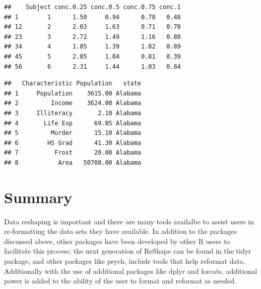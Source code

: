 \documentclass[]{book}
\newenvironment{Shaded}{\begin{snugshade}}{\end{snugshade}}
\newcommand{\DataTypeTok}[1]{\textcolor[rgb]{0.13,0.29,0.53}{#1}}
\newcommand{\KeywordTok}[1]{\textcolor[rgb]{0.13,0.29,0.53}{\textbf{#1}}}
\newcommand{\NormalTok}[1]{#1}
\newcommand{\OperatorTok}[1]{\textcolor[rgb]{0.81,0.36,0.00}{\textbf{#1}}}
\newcommand{\StringTok}[1]{\textcolor[rgb]{0.31,0.60,0.02}{#1}}
\begin{document}
\begin{verbatim}
##    Subject conc.0.25 conc.0.5 conc.0.75 conc.1
## 1        1      1.50     0.94      0.78   0.48
## 12       2      2.03     1.63      0.71   0.70
## 23       3      2.72     1.49      1.16   0.80
## 34       4      1.85     1.39      1.02   0.89
## 45       5      2.05     1.04      0.81   0.39
## 56       6      2.31     1.44      1.03   0.84
\end{verbatim}

\begin{Shaded}
\end{Shaded}

\begin{verbatim}
##   Characteristic Population   state
## 1     Population    3615.00 Alabama
## 2         Income    3624.00 Alabama
## 3     Illiteracy       2.10 Alabama
## 4       Life Exp      69.05 Alabama
## 5         Murder      15.10 Alabama
## 6        HS Grad      41.30 Alabama
## 7          Frost      20.00 Alabama
## 8           Area   50708.00 Alabama
\end{verbatim}

\hypertarget{summary}{%
\section{Summary}\label{summary}}

Data reshaping is important and there are many tools availalbe to assist users in re-formatting the data sets they have available. In addition to the packages discussed above, other packages have been developed by other R users to facilitate this process; the next generation of ReShape can be found in the tidyr package, and other packages like psych, include tools that help reformat data. Additionally with the use of additional packages like dplyr and forcats, additional power is added to the ability of the user to format and reformat as needed.
\end{document}
